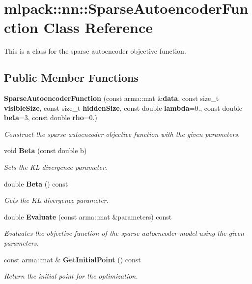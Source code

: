 \section{mlpack\+:\+:nn\+:\+:Sparse\+Autoencoder\+Function Class Reference}
\label{classmlpack_1_1nn_1_1SparseAutoencoderFunction}


This is a class for the sparse autoencoder objective function.  


\subsection*{Public Member Functions}
\begin{DoxyCompactItemize}
\item 
{\bf Sparse\+Autoencoder\+Function} (const arma\+::mat \&{\bf data}, const size\+\_\+t {\bf visible\+Size}, const size\+\_\+t {\bf hidden\+Size}, const double {\bf lambda}=0., const double {\bf beta}=3, const double {\bf rho}=0.)
\begin{DoxyCompactList}\small\item\em Construct the sparse autoencoder objective function with the given parameters. \end{DoxyCompactList}\item 
void {\bf Beta} (const double b)
\begin{DoxyCompactList}\small\item\em Sets the KL divergence parameter. \end{DoxyCompactList}\item 
double {\bf Beta} () const 
\begin{DoxyCompactList}\small\item\em Gets the KL divergence parameter. \end{DoxyCompactList}\item 
double {\bf Evaluate} (const arma\+::mat \&parameters) const 
\begin{DoxyCompactList}\small\item\em Evaluates the objective function of the sparse autoencoder model using the given parameters. \end{DoxyCompactList}\item 
const arma\+::mat \& {\bf Get\+Initial\+Point} () const 
\begin{DoxyCompactList}\small\item\em Return the initial point for the optimization. \end{DoxyCompactList}\item 

\end{DoxyCompactItemize}
